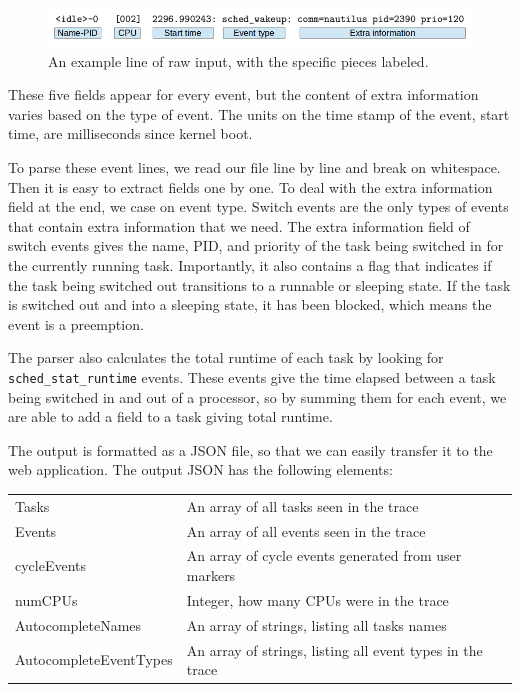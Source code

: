 \documentclass{hmcclinic}
\begin{document}
  \begin{figure}
  \includegraphics[scale=0.4]{parserExample.png}
  \caption{An example line of raw input, with the specific pieces labeled.}
  \end{figure}

  These five fields appear for every event, but the content of extra information
  varies based on the type of event. The units on the time stamp of the event,
  start time, are milliseconds since kernel boot.

  To parse these event lines, we read our file line by line and break on
  whitespace. Then it is easy to extract fields one by one. To deal with the
  extra information field at the end, we case on event type. Switch events
  are the only types of events that contain extra information that we need.  The
  extra information field of switch events gives the name, PID, and priority of
  the task being switched in for the currently running task. Importantly, it
  also contains a flag that indicates if the task being switched out transitions
  to a runnable or sleeping state. If the task is switched out and into a
  sleeping state, it has been blocked, which means the event is a preemption.

  The parser also calculates the total runtime of each task by looking for
\texttt{sched\_stat\_runtime} events. These events give the time elapsed between
  a task being switched in and out of a processor, so by summing them for 
  each event, we are able to add a field to a task giving total runtime.

  The output is formatted as a JSON file, so that we can easily transfer it to
  the web application. The output JSON has the following elements:

  \begin{center}
    \begin{tabular}{ll}
      \toprule
      Tasks      & An array of all tasks seen in the trace\\
      Events     & An array of all events seen in the trace\\
      cycleEvents & An array of cycle events generated from user markers\\
      numCPUs     & Integer, how many CPUs were in the trace\\
      AutocompleteNames & An array of strings, listing all tasks names\\
      AutocompleteEventTypes & An array of strings, listing all event types in the trace\\
      \bottomrule
    \end{tabular}
  \end{center}
\end{document}

